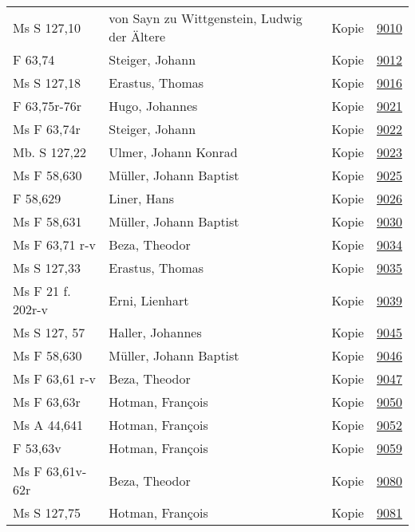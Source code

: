 \documentclass[10pt,a4paper,landscape]{report}
\begin{document}
\begin{longtable}{p{16cm}p{4cm}lr}
Ms S 127,10	&	von Sayn zu Wittgenstein, Ludwig der Ältere	&	Kopie	&	\href{http://130.60.24.72/assignment/9010}{9010}\\
F 63,74	&	Steiger, Johann	&	Kopie	&	\href{http://130.60.24.72/assignment/9012}{9012}\\
Ms S 127,18	&	Erastus, Thomas	&	Kopie	&	\href{http://130.60.24.72/assignment/9016}{9016}\\
F 63,75r-76r	&	Hugo, Johannes	&	Kopie	&	\href{http://130.60.24.72/assignment/9021}{9021}\\
Ms F 63,74r	&	Steiger, Johann	&	Kopie	&	\href{http://130.60.24.72/assignment/9022}{9022}\\
Mb. S 127,22	&	Ulmer, Johann Konrad	&	Kopie	&	\href{http://130.60.24.72/assignment/9023}{9023}\\
Ms F 58,630	&	Müller, Johann Baptist	&	Kopie	&	\href{http://130.60.24.72/assignment/9025}{9025}\\
F 58,629	&	Liner, Hans	&	Kopie	&	\href{http://130.60.24.72/assignment/9026}{9026}\\
Ms F 58,631	&	Müller, Johann Baptist	&	Kopie	&	\href{http://130.60.24.72/assignment/9030}{9030}\\
Ms F 63,71 r-v	&	Beza, Theodor	&	Kopie	&	\href{http://130.60.24.72/assignment/9034}{9034}\\
Ms S 127,33	&	Erastus, Thomas	&	Kopie	&	\href{http://130.60.24.72/assignment/9035}{9035}\\
Ms F 21 f. 202r-v	&	Erni, Lienhart	&	Kopie	&	\href{http://130.60.24.72/assignment/9039}{9039}\\
Ms S 127, 57	&	Haller, Johannes	&	Kopie	&	\href{http://130.60.24.72/assignment/9045}{9045}\\
Ms F 58,630	&	Müller, Johann Baptist	&	Kopie	&	\href{http://130.60.24.72/assignment/9046}{9046}\\
Ms F 63,61 r-v	&	Beza, Theodor	&	Kopie	&	\href{http://130.60.24.72/assignment/9047}{9047}\\
Ms F 63,63r	&	Hotman, François	&	Kopie	&	\href{http://130.60.24.72/assignment/9050}{9050}\\
Ms A 44,641	&	Hotman, François	&	Kopie	&	\href{http://130.60.24.72/assignment/9052}{9052}\\
F 53,63v	&	Hotman, François	&	Kopie	&	\href{http://130.60.24.72/assignment/9059}{9059}\\
Ms F 63,61v-62r	&	Beza, Theodor	&	Kopie	&	\href{http://130.60.24.72/assignment/9080}{9080}\\
Ms S 127,75	&	Hotman, François	&	Kopie	&	\href{http://130.60.24.72/assignment/9081}{9081}\\

\end{longtable}
\end{document}
